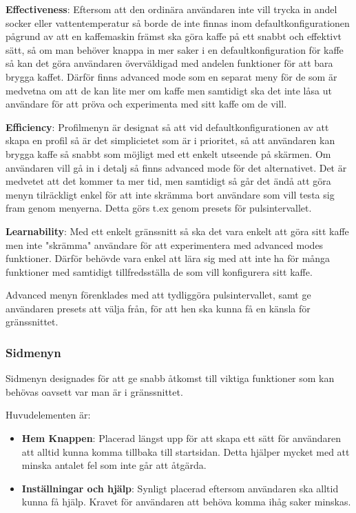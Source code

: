 \textbf{Effectiveness}: Eftersom att den ordinära användaren inte vill trycka in andel socker eller vattentemperatur så borde de inte finnas inom defaultkonfigurationen pågrund av att en kaffemaskin främst ska göra kaffe på ett snabbt och effektivt sätt, så om man behöver knappa in mer saker i en defaultkonfiguration för kaffe så kan det göra användaren överväldigad med andelen funktioner för att bara brygga kaffet. Därför finns advanced mode som en separat meny för de som är medvetna om att de kan lite mer om kaffe men samtidigt ska det inte låsa ut användare för att pröva och experimenta med sitt kaffe om de vill.

\textbf{Efficiency}: Profilmenyn är designat så att vid defaultkonfigurationen av att skapa en profil så är det simplicietet som är i prioritet, så att användaren kan brygga kaffe så snabbt som möjligt med ett enkelt utseende på skärmen. Om användaren vill gå in i detalj så finns advanced mode för det alternativet. Det är medvetet att det kommer ta mer tid, men samtidigt så går det ändå att göra menyn tilräckligt enkel för att inte skrämma bort användare som vill testa sig fram genom menyerna. Detta görs t.ex genom presets för pulsintervallet.

\textbf{Learnability}: Med ett enkelt gränssnitt så ska det vara enkelt att göra sitt kaffe men inte "skrämma" användare för att experimentera med advanced modes funktioner. Därför behövde vara enkel att lära sig med att inte ha för många funktioner med samtidigt tillfredsställa de som vill konfigurera sitt kaffe.

Advanced menyn förenklades med att tydliggöra pulsintervallet, samt ge användaren presets att välja från, för att hen ska kunna få en känsla för gränssnittet.


\subsubsection{Sidmenyn}
Sidmenyn designades för att ge snabb åtkomst till viktiga funktioner som kan behövas oavsett var man är i gränssnittet.  

Huvudelementen är:
\begin{itemize}
    \item \textbf{Hem Knappen}: Placerad längst upp för att skapa ett sätt för användaren att alltid kunna komma tillbaka till startsidan. Detta hjälper mycket med att minska antalet fel som inte går att åtgärda. 
    \item \textbf{Inställningar och hjälp}: Synligt placerad eftersom användaren ska alltid kunna få hjälp. Kravet för användaren att behöva komma ihåg saker minskas.
\end{itemize}



